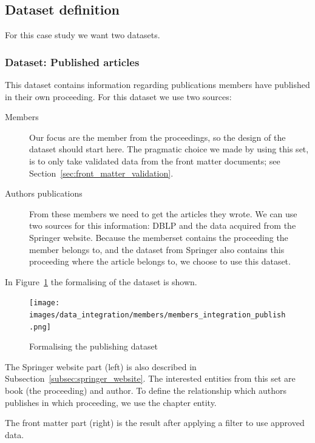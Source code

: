 \documentclass{ou-report}
\begin{document}
\subsection{Dataset definition}
For this case study we want two datasets.

\subsubsection{Dataset: Published articles}
\label{subsubsec:dataset_published_articles}
This dataset contains information regarding publications members have published 
in their own proceeding. For this dataset we use two sources:
\begin{description}
    \item[Members] Our focus are the member from the proceedings, so the design of the dataset
    should start here. The pragmatic choice we made by using this set, is to only
    take validated data from the front matter documents; see 
    Section~\ref{sec:front_matter_validation}.
    \item[Authors publications] From these members we need to get the articles they wrote. We can use two sources
    for this information: DBLP and the data acquired from the Springer website.
    Because the memberset contains the proceeding the member belongs to, and the
    dataset from Springer also contains this proceeding where the article belongs to, 
    we choose to use this dataset.
\end{description}

In Figure~\ref{fig:members_integration_publish} the formalising of the dataset
is shown.

\begin{figure}[H]
    \centering
    \texttt{[image: images/data\_integration/members/members\_integration\_publish.png]}
    \caption{Formalising the publishing dataset}
    \label{fig:members_integration_publish}
\end{figure}

The Springer website part (left) is also described in 
Subsection~\ref{subsec:springer_website}. The interested entities from this set
are book (the proceeding) and author. To define the relationship which authors 
publishes in which proceeding, we use the chapter entity.

The front matter part (right) is the result after applying a filter to use 
approved data. 
\end{document}
